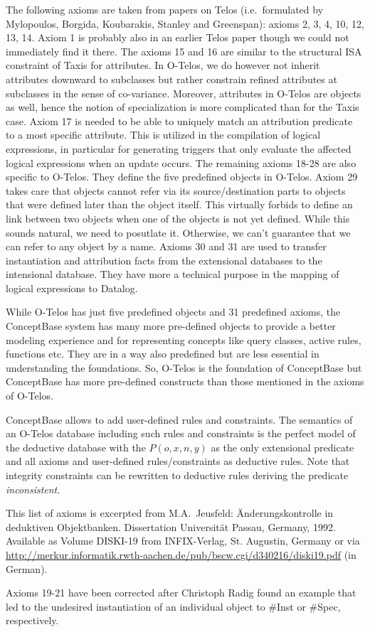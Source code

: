 The following axioms are taken from papers on Telos (i.e.\ formulated by Mylopoulos,
Borgida, Kouba\-ra\-kis, Stanley and Greenspan): axioms 2, 3, 4, 10, 12, 13, 14.
Axiom 1 is probably also in an earlier Telos paper though we could not 
immediately find it there. The axioms 15 and 16 are similar to the structural
ISA constraint of Taxis \cite{Taxis80} for attributes. 
In O-Telos, we do however not inherit attributes downward to subclasses 
but rather constrain refined attributes at subclasses in the sense
of co-variance. 
Moreover, attributes in O-Telos are objects as well, hence the notion of specialization is
more complicated than for the Taxis case.
Axiom 17 is needed
to be able to uniquely match an attribution predicate to a most specific attribute.
This is utilized in the compilation of logical expressions, in particular for
generating triggers that only evaluate the affected logical expressions when an update
occurs. The remaining axioms 18-28 are also specific to O-Telos. They define the five
predefined objects in O-Telos. Axiom 29 takes care that objects cannot refer via
its source/destination parts to objects that were defined later than the object itself.
This virtually forbids to define an link between two objects when one of the objects is
not yet defined. While this sounds natural, we need to posutlate it. Otherwise, we can't
guarantee that we can refer to any object by a name.
Axioms 30 and 31 are used to transfer instantiation
and attribution facts from the extensional databases to the intensional database.
They have more a technical purpose in the mapping of logical expressions to
Datalog.

While O-Telos has just five predefined objects and 31 predefined axioms, the
ConceptBase system has many more pre-defined objects to provide a better
modeling experience and for representing concepts like query classes, active
rules, functions etc. They are in a way also predefined but are less essential
in understanding the foundations. So, O-Telos is the foundation of ConceptBase
but ConceptBase has more pre-defined constructs than those mentioned in
the axioms of O-Telos. 


ConceptBase allows to add user-defined rules and constraints. The semantics
of an O-Telos database including such rules and constraints is 
the perfect model of the deductive database with the $P(o,x,n,y)$
as the only extensional predicate and all axioms and user-defined rules/constraints
as deductive rules. Note that integrity constraints can be rewritten to deductive rules
deriving the predicate {\it inconsistent}.

This list of axioms is excerpted from
M.A.~Jeusfeld: \"Anderungskontrolle in deduktiven Objektbanken.
Dissertation Universit\"at Passau, Germany, 1992. Available
as Volume DISKI-19 from INFIX-Verlag, St. Augustin, Germany or
via \url{http://merkur.informatik.rwth-aachen.de/pub/bscw.cgi/d340216/diski19.pdf} (in German).

Axioms 19-21 have been corrected after Christoph Radig found
an example that led to the undesired instantiation of an
individual object to \#Inst or \#Spec, respectively.




